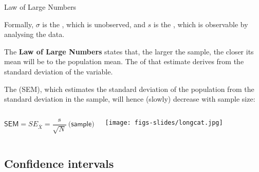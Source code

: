 \documentclass{beamer}
\begin{document}
	\begin{frame}[t]{Law of Large Numbers}

	Formally, $\sigma$ is the , which is unobserved, and $s$ is the , which is observable by analysing the data.\vspace{1em}

The \textbf{Law of Large Numbers} states that, the larger the sample, the closer its mean will be to the population mean. The  of that estimate derives from the standard deviation of the variable.\vspace{1em}

The  (SEM), which estimates the standard deviation of the population from the standard deviation in the sample, will hence (slowly) decrease with sample size:

\vspace{1em}

		\begin{columns}[T]
		$$\textsf{SEM} = SE_{\bar X} = \frac{s}{\sqrt{N}}~\textsf{(sample)}$$
		\begin{flushright}
		\vspace{-4em}
		\texttt{[image: figs-slides/longcat.jpg]}		
		\end{flushright}
		\end{columns}
	\end{frame}

	
	\subsection{Confidence intervals}
		
\end{document}
